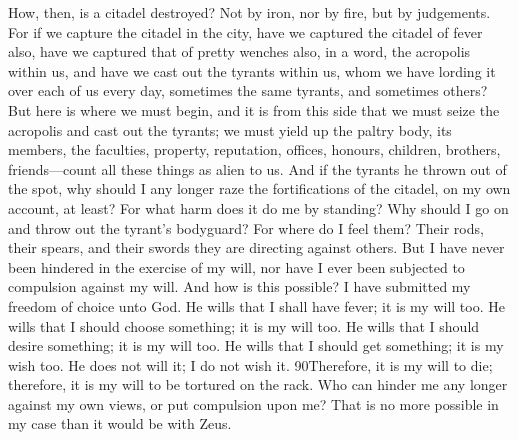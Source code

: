 How, then, is a citadel destroyed? Not by iron, nor by fire, but by judgements. For if we capture the citadel in the city, have we captured the citadel of fever also, have we captured that of pretty wenches also, in a word, the acropolis within us, and have we cast out the tyrants within us, whom we have lording it over each of us every day, sometimes the same tyrants, and sometimes others? But here is where we must begin, and it is from this side that we must seize the acropolis and cast out the tyrants; we must yield up the paltry body, its members, the faculties, property, reputation, offices, honours, children, brothers, friends—count all these things as alien to us. And if the tyrants he thrown out of the spot, why should I any longer raze the fortifications of the citadel, on my own account, at least? For what harm does it do me by standing? Why should I go on and throw out the tyrant's bodyguard? For where do I feel them? Their rods, their spears, and their swords they are directing against others. But I have never been hindered in the exercise of my will, nor have I ever been subjected to compulsion against my will. And how is this possible? I have submitted my freedom of choice unto God. He wills that I shall have fever; it is my will too. He wills that I should choose something; it is my will too. He wills that I should desire something; it is my will too. He wills that I should get something; it is my wish too. He does not will it; I do not wish it. 90Therefore, it is my will to die; therefore, it is my will to be tortured on the rack. Who can hinder me any longer against my own views, or put compulsion upon me? That is no more possible in my case than it would be with Zeus.

